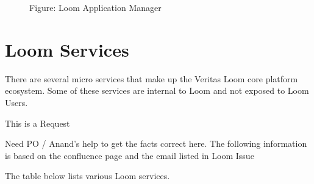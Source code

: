 \documentclass[letterpaper,10pt,english]{sphinxmanual}
\begin{document}
\begin{figure}[htbp]
\centering
\capstart

\noindent{}
\caption{Figure: Loom Application Manager}\label{\detokenize{mcdmp_concepts:id16}}\end{figure}


\section{Loom  Services}
\label{\detokenize{mcdmp_concepts:loom-services}}
There are several micro services that make up the Veritas Loom core platform ecosystem.  Some of these services are internal to Loom and not exposed to Loom Users.




This is a  Request

Need PO / Anand’s help to get the facts correct here.
The following information is based on the confluence page  and the email listed in Loom Issue 



The table below lists various Loom services.
\end{document}
